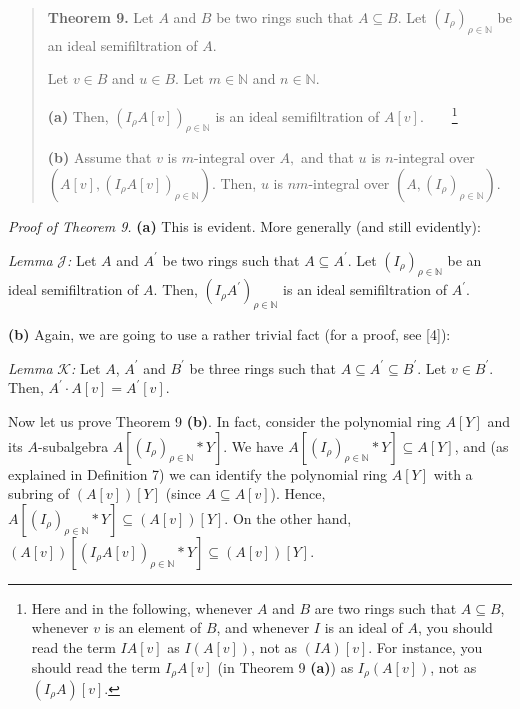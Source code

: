 \documentclass[12pt,final,notitlepage,onecolumn]{article}%
\begin{document}
\begin{quote}
\textbf{Theorem 9.} Let $A$ and $B$ be two rings such that $A\subseteq B$. Let
$\left(  I_{\rho}\right)  _{\rho\in\mathbb{N}}$ be an ideal semifiltration of
$A$.

Let $v\in B$ and $u\in B$. Let $m\in\mathbb{N}$ and $n\in\mathbb{N}$.

\textbf{(a)} Then, $\left(  I_{\rho}A\left[  v\right]  \right)  _{\rho
\in\mathbb{N}}$ is an ideal semifiltration of $A\left[  v\right]
$.\ \ \ \ \footnote{Here and in the following, whenever $A$ and $B$ are two
rings such that $A\subseteq B$, whenever $v$ is an element of $B$, and
whenever $I$ is an ideal of $A$, you should read the term $IA\left[  v\right]
$ as $I\left(  A\left[  v\right]  \right)  $, not as $\left(  IA\right)
\left[  v\right]  $. For instance, you should read the term $I_{\rho}A\left[
v\right]  $ (in Theorem 9 \textbf{(a)}) as $I_{\rho}\left(  A\left[  v\right]
\right)  $, not as $\left(  I_{\rho}A\right)  \left[  v\right]  $.}

\textbf{(b)} Assume that $v$ is $m$-integral over $A,$ and that $u$ is
$n$-integral over $\left(  A\left[  v\right]  ,\left(  I_{\rho}A\left[
v\right]  \right)  _{\rho\in\mathbb{N}}\right)  $. Then, $u$ is $nm$-integral
over $\left(  A,\left(  I_{\rho}\right)  _{\rho\in\mathbb{N}}\right)  $.
\end{quote}

\textit{Proof of Theorem 9.} \textbf{(a)} This is evident. More generally (and
still evidently):

\textit{Lemma }$\mathcal{J}$\textit{:} Let $A$ and $A^{\prime}$ be two rings
such that $A\subseteq A^{\prime}$. Let $\left(  I_{\rho}\right)  _{\rho
\in\mathbb{N}}$ be an ideal semifiltration of $A$. Then, $\left(  I_{\rho
}A^{\prime}\right)  _{\rho\in\mathbb{N}}$ is an ideal semifiltration of
$A^{\prime}$.

\textbf{(b)} Again, we are going to use a rather trivial fact (for a proof,
see [4]):

\textit{Lemma }$\mathcal{K}$\textit{:} Let $A$, $A^{\prime}$ and $B^{\prime}$
be three rings such that $A\subseteq A^{\prime}\subseteq B^{\prime}$. Let
$v\in B^{\prime}$. Then, $A^{\prime}\cdot A\left[  v\right]  =A^{\prime
}\left[  v\right]  $.

Now let us prove Theorem 9 \textbf{(b)}. In fact, consider the polynomial ring
$A\left[  Y\right]  $ and its $A$-subalgebra $A\left[  \left(  I_{\rho
}\right)  _{\rho\in\mathbb{N}}\ast Y\right]  $. We have $A\left[  \left(
I_{\rho}\right)  _{\rho\in\mathbb{N}}\ast Y\right]  \subseteq A\left[
Y\right]  $, and (as explained in Definition 7) we can identify the polynomial
ring $A\left[  Y\right]  $ with a subring of $\left(  A\left[  v\right]
\right)  \left[  Y\right]  $ (since $A\subseteq A\left[  v\right]  $). Hence,
$A\left[  \left(  I_{\rho}\right)  _{\rho\in\mathbb{N}}\ast Y\right]
\subseteq\left(  A\left[  v\right]  \right)  \left[  Y\right]  $. On the other
hand, $\left(  A\left[  v\right]  \right)  \left[  \left(  I_{\rho}A\left[
v\right]  \right)  _{\rho\in\mathbb{N}}\ast Y\right]  \subseteq\left(
A\left[  v\right]  \right)  \left[  Y\right]  $.
\end{document}
